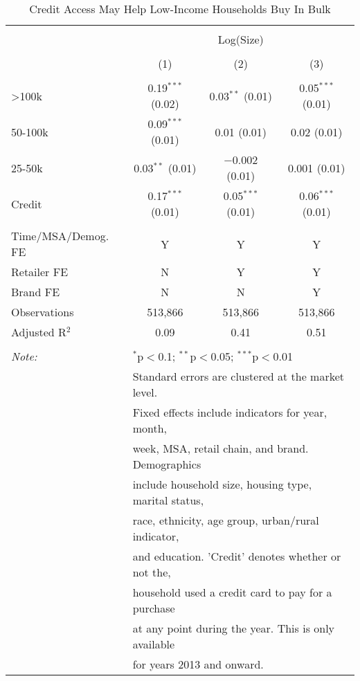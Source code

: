 
\begin{table}[!htbp] \centering 
  \caption{Credit Access May Help Low-Income Households Buy In Bulk} 
  \label{tab:packageSizeFullTpLiq} 
\begin{tabular}{@{\extracolsep{5pt}}lccc} 
\\[-1.8ex]\hline 
\hline \\[-1.8ex] 
 & \multicolumn{3}{c}{Log(Size)} \\ 
\\[-1.8ex] & (1) & (2) & (3)\\ 
\hline \\[-1.8ex] 
 >100k & 0.19$^{***}$ (0.02) & 0.03$^{**}$ (0.01) & 0.05$^{***}$ (0.01) \\ 
  50-100k & 0.09$^{***}$ (0.01) & 0.01 (0.01) & 0.02 (0.01) \\ 
  25-50k & 0.03$^{**}$ (0.01) & $-$0.002 (0.01) & 0.001 (0.01) \\ 
  Credit & 0.17$^{***}$ (0.01) & 0.05$^{***}$ (0.01) & 0.06$^{***}$ (0.01) \\ 
 \hline \\[-1.8ex] 
Time/MSA/Demog. FE & Y & Y & Y \\ 
Retailer FE & N & Y & Y \\ 
Brand FE & N & N & Y \\ 
Observations & 513,866 & 513,866 & 513,866 \\ 
Adjusted R$^{2}$ & 0.09 & 0.41 & 0.51 \\ 
\hline 
\hline \\[-1.8ex] 
\textit{Note:}  & \multicolumn{3}{l}{$^{*}$p$<$0.1; $^{**}$p$<$0.05; $^{***}$p$<$0.01} \\ 
 & \multicolumn{3}{l}{Standard errors are clustered at the market level.} \\ 
 & \multicolumn{3}{l}{Fixed effects include indicators for year, month, } \\ 
 & \multicolumn{3}{l}{week, MSA, retail chain, and brand. Demographics } \\ 
 & \multicolumn{3}{l}{include household size, housing type, marital status, } \\ 
 & \multicolumn{3}{l}{race, ethnicity, age group, urban/rural indicator, } \\ 
 & \multicolumn{3}{l}{and education. 'Credit' denotes whether or not the,} \\ 
 & \multicolumn{3}{l}{household used a credit card to pay for a purchase } \\ 
 & \multicolumn{3}{l}{at any point during the year. This is only available } \\ 
 & \multicolumn{3}{l}{for years 2013 and onward.} \\ 
\end{tabular} 
\end{table} 

